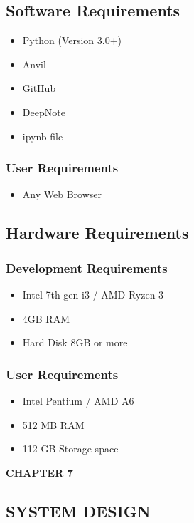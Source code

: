 \documentclass[12pt]{article}
\begin{document}
\subsection{Software Requirements}
\begin{itemize}
\item Python (Version 3.0+)
\item Anvil
\item GitHub
\item DeepNote
\item ipynb file
\end{itemize}

\subsubsection{User Requirements}
\begin{itemize}
\item Any Web Browser
\end{itemize}

\subsection{Hardware Requirements}
\subsubsection{Development Requirements}
\begin{itemize}
\item Intel 7th gen i3 / AMD Ryzen 3
\item 4GB RAM
\item Hard Disk 8GB or more
\end{itemize}

\subsubsection{User Requirements}
\begin{itemize}
\item Intel Pentium / AMD A6
\item 512 MB RAM
\item 112 GB Storage space
\end{itemize}

\newpage
\begin{flushleft}\textbf{CHAPTER 7} \end{flushleft}
\begin{flushleft}\section{SYSTEM DESIGN} \end{flushleft}
\vspace*{10px}
\end{document}
